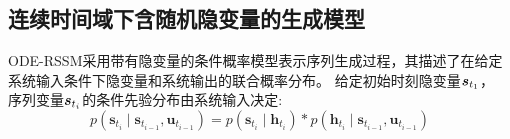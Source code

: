 


\subsection{连续时间域下含随机隐变量的生成模型}



ODE-RSSM采用带有隐变量的条件概率模型表示序列生成过程，其描述了在给定系统输入条件下隐变量和系统输出的联合概率分布。
给定初始时刻隐变量$\boldsymbol{s}_{t_1}$， 序列变量$\boldsymbol{s}_{t_i}$的条件先验分布由系统输入决定:
\begin{equation}
p\left(\boldsymbol{s}_{t_{i}} \mid \boldsymbol{s}_{t_{i-1}}, \boldsymbol{u}_{t_{i-1}}\right)=p\left(\boldsymbol{s}_{t_{i}} \mid \boldsymbol{h}_{t_{i}}\right)*
p\left(\boldsymbol{h}_{t_{i}} \mid \boldsymbol{s}_{t_{i-1}}, \boldsymbol{u}_{t_{i-1}}\right)
\label{equ:prob_latent}
\end{equation}

